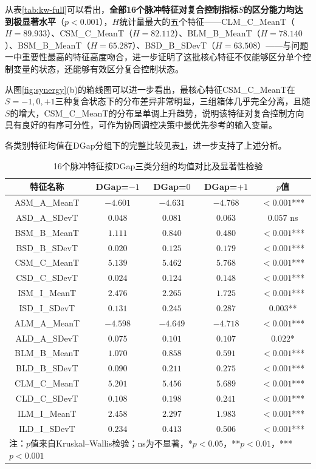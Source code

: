 \documentclass[UTF8,a4paper,12pt]{ctexart}
\begin{document}
从表\ref{tab:kw-full}可以看出，\textbf{全部16个脉冲特征对复合控制指标$S$的区分能力均达到极显著水平}（$p<0.001$），$H$统计量最大的五个特征——CLM\_C\_MeanT（$H=89.933$）、CSM\_C\_MeanT（$H=82.112$）、BLM\_B\_MeanT（$H=78.140$）、BSM\_B\_MeanT（$H=65.287$）、BSD\_B\_SDevT（$H=63.508$）——与问题一中重要性最高的特征高度吻合，进一步证明了这批核心特征不仅能够区分单个控制变量的状态，还能够有效区分复合控制状态。

从图\ref{fig:synergy}(b)的箱线图可以进一步看出，最核心特征CSM\_C\_MeanT在$S=-1,0,+1$三种复合状态下的分布差异非常明显，三组箱体几乎完全分离，且随$S$的增大，CSM\_C\_MeanT的分布呈单调上升趋势，说明该特征对复合控制方向具有良好的有序可分性，可作为协同调控决策中最优先参考的输入变量。

各类别特征均值在DGap分组下的完整比较见表\ref{tab:class_means}，进一步支持了上述分析。

\begin{table}[H]
\centering
\caption{16个脉冲特征按DGap三类分组的均值对比及显著性检验}
\label{tab:class_means}
\begin{tabular}{ccccc}
\toprule
特征名称 & DGap=$-1$ & DGap=$0$ & DGap=$+1$ & $p$值 \\
\midrule
ASM\_A\_MeanT & $-4.601$ & $-4.631$ & $-4.768$ & $<0.001$*** \\
ASD\_A\_SDevT & $0.048$ & $0.081$ & $0.063$ & $0.057$ ns \\
BSM\_B\_MeanT & $1.111$ & $0.840$ & $0.480$ & $<0.001$*** \\
BSD\_B\_SDevT & $0.020$ & $0.125$ & $0.179$ & $<0.001$*** \\
CSM\_C\_MeanT & $5.139$ & $5.462$ & $5.768$ & $<0.001$*** \\
CSD\_C\_SDevT & $0.024$ & $0.124$ & $0.148$ & $<0.001$*** \\
ISM\_I\_MeanT & $2.476$ & $2.265$ & $1.725$ & $<0.001$*** \\
ISD\_I\_SDevT & $0.131$ & $0.245$ & $0.287$ & $0.003$** \\
ALM\_A\_MeanT & $-4.598$ & $-4.649$ & $-4.718$ & $<0.001$*** \\
ALD\_A\_SDevT & $0.075$ & $0.101$ & $0.107$ & $0.022$* \\
BLM\_B\_MeanT & $1.070$ & $0.858$ & $0.591$ & $<0.001$*** \\
BLD\_B\_SDevT & $0.090$ & $0.211$ & $0.275$ & $<0.001$*** \\
CLM\_C\_MeanT & $5.201$ & $5.456$ & $5.689$ & $<0.001$*** \\
CLD\_C\_SDevT & $0.108$ & $0.198$ & $0.241$ & $<0.001$*** \\
ILM\_I\_MeanT & $2.458$ & $2.297$ & $1.983$ & $<0.001$*** \\
ILD\_I\_SDevT & $0.234$ & $0.413$ & $0.506$ & $<0.001$*** \\
\bottomrule
\multicolumn{5}{l}{\footnotesize 注：$p$值来自Kruskal--Wallis检验；ns为不显著，*$p<0.05$，**$p<0.01$，***$p<0.001$}
\end{tabular}
\end{table}
\end{document}
